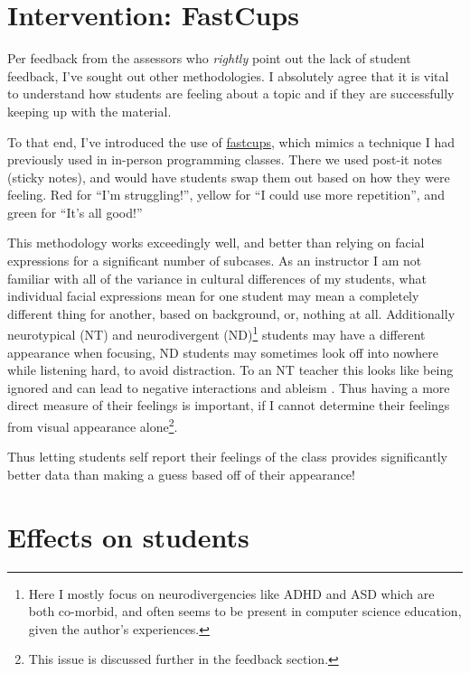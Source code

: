 \documentclass[paper=a4,justified,a4paper]{tufte-handout}
\begin{document}
\hypertarget{intervention-fastcups}{%
\section{Intervention: FastCups}\label{intervention-fastcups}}

Per feedback from the assessors who \emph{rightly} point out the lack of
student feedback, I've sought out other methodologies. I absolutely
agree that it is vital to understand how students are feeling about a
topic and if they are successfully keeping up with the material.

To that end, I've introduced the use of
\href{http://cups.fast.ai/}{fastcups}, which mimics a technique I had
previously used in in-person programming classes. There we used post-it
notes (sticky notes), and would have students swap them out based on how
they were feeling. Red for ``I'm struggling!'', yellow for ``I could use
more repetition'', and green for ``It's all good!''

This methodology works exceedingly well, and better than relying on
facial expressions for a significant number of subcases. As an
instructor I am not familiar with all of the variance in cultural
differences of my students, what individual facial expressions mean for
one student may mean a completely different thing for another, based on
background, or, nothing at all. Additionally neurotypical (NT) and
neurodivergent
(ND)\footnote{Here I mostly focus on neurodivergencies like ADHD and ASD which are both co-morbid, and often seems to be present in computer science education, given the author's experiences.}
students may have a different appearance when focusing, ND students may
sometimes look off into nowhere while listening hard, to avoid
distraction. To an NT teacher this looks like being ignored and can lead
to negative interactions and ableism \citep{Clouder2020-ux}. Thus having
a more direct measure of their feelings is important, if I cannot
determine their feelings from visual appearance
alone\footnote{This issue is discussed further in the feedback section.}.

Thus letting students self report their feelings of the class provides
significantly better data than making a guess based off of their
appearance!

\hypertarget{effects-on-students}{%
\section{Effects on students}\label{effects-on-students}}
\end{document}

